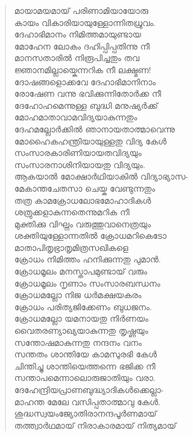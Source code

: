 \begin{verse}
മായാമയമായ് പരിണാമിയായോരു\\
കായം വികാരിയായുള്ളോന്നിതധ്രുവം.\\
ദേഹാഭിമാനം നിമിത്തമായുണ്ടായ\\
മോഹേന ലോകം ദഹിപ്പിപ്പതിന്നു നീ\\
മാനസതാരില്‍ നിരൂപിച്ചതും തവ\\
ജ്ഞാനമില്ലായ്കെന്നറിക നീ ലക്ഷ്മണ!\\
ദോഷങ്ങളൊക്കവേ ദേഹാഭിമാനിനാം\\
രോഷേണ വന്നു ഭവിക്കുന്നിതോര്‍ക്ക നീ\\
ദേഹോഹമെന്നുള്ള ബുദ്ധി മനുഷ്യര്‍ക്ക്\\
മോഹമാതാവാമവിദ്യയാകുന്നതും\\
ദേഹമല്ലോര്‍ക്കില്‍ ഞാനായതാത്മാവെന്നു\\
മോഹൈകഹന്ത്രിയായുള്ളതു വിദ്യ കേള്‍\\
സംസാരകാരിണിയായതവിദ്യയും\\
സംസാരനാശിനിയായതു വിദ്യയും.\\
ആകയാല്‍ മോക്ഷാര്‍ഥിയാകില്‍ വിദ്യാഭ്യാസ-\\
മേകാന്തചേതസാ ചെയ്ക വേണ്ടുന്നതും\\
തത്ര കാമക്രോധലോഭമോഹാദികള്‍\\
ശത്രുക്കളാകുന്നതെന്നുമറിക നീ\\
മുക്തിക്കു വിഘ്നം വരുത്തുവാനെത്രയും\\
ശക്തിയുള്ളോന്നതില്‍ ക്രോധമറികെടോ\\
മാതാപിതൃഭ്രാതൃമിത്രസഖികളെ\\
ക്രോധം നിമിത്തം ഹനിക്കുന്നതു പുമാന്‍.\\
ക്രോധമൂലം മനസ്താപമുണ്ടായ് വരും\\
ക്രോധമൂലം നൃണാം സംസാരബന്ധനം\\
ക്രോധമല്ലോ നിജ ധര്‍മക്ഷയകരം\\
ക്രോധം പരിത്യജിക്കേണം ബുധജനം.\\
ക്രോധമല്ലോ യമനായതു നിര്‍ണയം\\
വൈതരണ്യാഖ്യയാകുന്നതു തൃഷ്ണയും\\
സന്തോഷമാകുന്നതു നന്ദനം വനം\\
സന്തതം ശാന്തിയേ കാമസുരഭി കേള്‍\\
ചിന്തിച്ചു ശാന്തിയെത്തന്നെ ഭജിക്ക നീ\\
സന്താപമെന്നാലൊരുജാതിയും വരാ.\\
ദേഹേന്ദ്രിയപ്രാണബുദ്ധ്യാദികള്‍ക്കെല്ലാ-\\
മാഹന്ത മേലേ വസിപ്പതാത്മാവു കേള്‍.\\
ശുദ്ധസ്വയംജ്യോതിരാനന്ദപൂര്‍ണമായ്\\
തത്ത്വാര്‍ഥമായ് നിരാകാരമായ് നിത്യമായ്\\

\end{verse}
